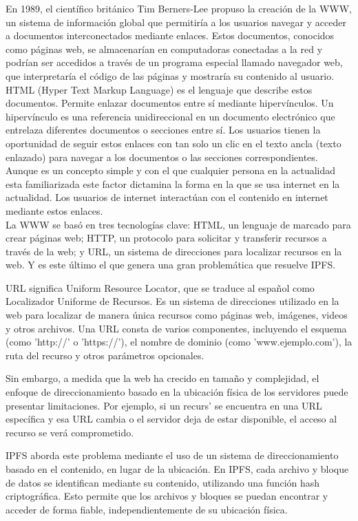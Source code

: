 En 1989, el científico británico Tim Berners-Lee propuso la creación de la WWW, un sistema de información
global que permitiría a los usuarios navegar y acceder a documentos interconectados mediante
enlaces. Estos documentos, conocidos como páginas web, se almacenarían en computadoras conectadas a la red y podrían ser accedidos
a través de un programa especial llamado navegador web, que interpretaría el código de las páginas y mostraría su contenido al usuario.
\\HTML (Hyper Text Markup Language) es el lenguaje que describe estos documentos. Permite enlazar documentos entre sí mediante hipervínculos. Un hipervínculo es una referencia unidireccional en un documento electrónico que entrelaza diferentes documentos o secciones entre sí. Los usuarios tienen la oportunidad de seguir estos enlaces con tan solo un clic en el texto ancla (texto enlazado) para navegar a los documentos o las secciones correspondientes\cite{Hiperenlace2023}.
Aunque es un concepto simple y con el que cualquier persona en la actualidad esta familiarizada este factor dictamina la forma
en la que se usa internet en la actualidad. Los usuarios de internet interactúan con el contenido en internet mediante estos enlaces.
\\La WWW se basó en tres tecnologías clave: HTML, un lenguaje de marcado para crear páginas web; HTTP, un protocolo para solicitar y transferir recursos a través de la web; y URL, un sistema de direcciones para localizar recursos en la web\cite{leinerBriefHistoryInternet1999}. Y es este último el que genera una gran problemática que resuelve IPFS.

URL significa Uniform Resource Locator, que se traduce al español como Localizador Uniforme de Recursos. Es un sistema de direcciones utilizado en la web para localizar de manera única recursos como páginas web, imágenes, videos y otros archivos. Una URL consta de varios componentes, incluyendo el esquema (como 'http://' o 'https://'), el nombre de dominio (como 'www.ejemplo.com'), la ruta del recurso y otros parámetros opcionales.

\setlength{\parskip}{10pt}
Sin embargo, a medida que la web ha crecido en tamaño y complejidad, el enfoque de direccionamiento basado en la ubicación física
de los servidores puede presentar limitaciones. Por ejemplo, si un recurs' se encuentra en una URL específica y esa URL cambia o
el servidor deja de estar disponible, el acceso al recurso se verá comprometido.

IPFS aborda este problema mediante el uso de un sistema de direccionamiento basado en el contenido, en lugar de la ubicación. En
IPFS, cada archivo y bloque de datos se identifican mediante su contenido, utilizando una función hash criptográfica. Esto
permite que los archivos y bloques se puedan encontrar y acceder de forma fiable, independientemente de su ubicación física.

